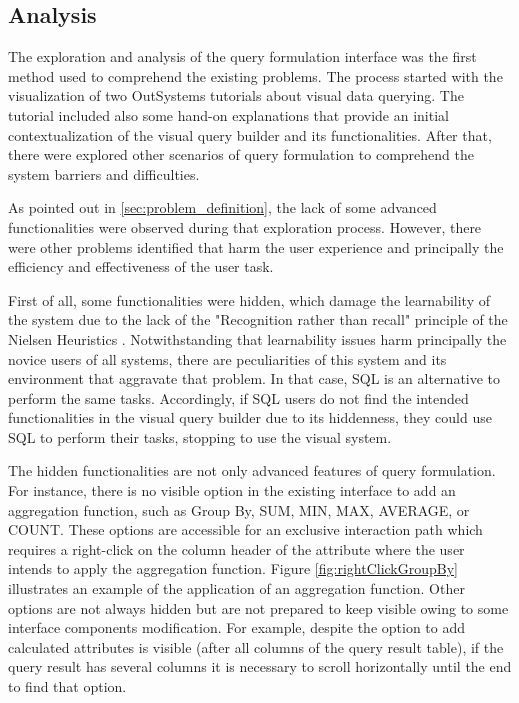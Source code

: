 \subsection{Analysis}
\label{subsec:analysis}

The exploration and analysis of the query formulation interface was the first method used to comprehend the existing problems. The process started with the visualization of two OutSystems tutorials \cite{outsystems_tutorial_aggregates_101, outsystems_tutorial_advanced_aggregates} about visual data querying. The tutorial included also some hand-on explanations that provide an initial contextualization of the visual query builder and its functionalities. After that, there were explored other scenarios of query formulation to comprehend the system barriers and difficulties.

As pointed out in \ref{sec:problem_definition}, the lack of some advanced functionalities were observed during that exploration process. However, there were other problems identified that harm the user experience and principally the efficiency and effectiveness of the user task.

First of all, some functionalities were hidden, which damage the learnability of the system due to the lack of the "Recognition rather than recall" principle of the Nielsen Heuristics \cite{nielsen_heuristics}. Notwithstanding that learnability issues harm principally the novice users of all systems, there are peculiarities of this system and its environment that aggravate that problem. In that case, SQL is an alternative to perform the same tasks. Accordingly, if SQL users do not find the intended functionalities in the visual query builder due to its hiddenness, they could use SQL to perform their tasks, stopping to use the visual system.

The hidden functionalities are not only advanced features of query formulation. For instance, there is no visible option in the existing interface to add an aggregation function, such as Group By, SUM, MIN, MAX, AVERAGE, or COUNT. These options are accessible for an exclusive interaction path which requires a right-click on the column header of the attribute where the user intends to apply the aggregation function. Figure \ref{fig:rightClickGroupBy} illustrates an example of the application of an aggregation function. Other options are not always hidden but are not prepared to keep visible owing to some interface components modification. For example, despite the option to add calculated attributes is visible (after all columns of the query result table), if the query result has several columns it is necessary to scroll horizontally until the end to find that option.

